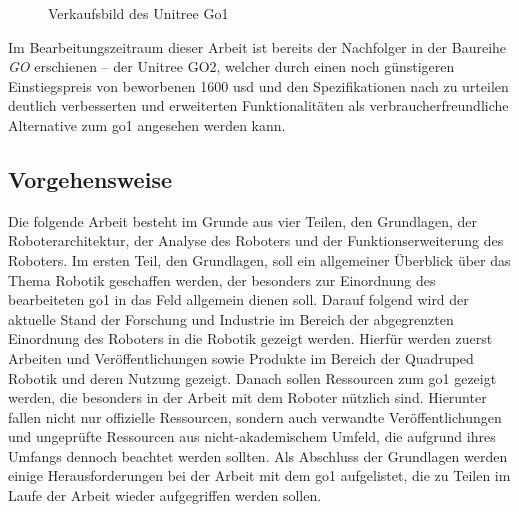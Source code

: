 \begin{figure}[h]
    \caption[Verkaufsbild des Unitree Go1]{Verkaufsbild des Unitree Go1\footnotemark}\label{fig:go1-ad-foto}
\end{figure}


Im Bearbeitungszeitraum dieser Arbeit ist bereits der Nachfolger in der Baureihe \emph{GO} erschienen -- der Unitree GO2,
welcher durch einen noch günstigeren Einstiegspreis von beworbenen \num{1600} \gls{usd} und den Spezifikationen nach zu urteilen
deutlich verbesserten und erweiterten Funktionalitäten als verbraucherfreundliche Alternative zum \gls{go1} angesehen
werden kann.

\subsection{Vorgehensweise}
\label{subsec:intro-vorgehensweise}

Die folgende Arbeit besteht im Grunde aus vier Teilen, den Grundlagen, der Roboterarchitektur, der Analyse des Roboters
und der Funktionserweiterung des Roboters.
Im ersten Teil, den Grundlagen, soll ein allgemeiner Überblick über das Thema Robotik geschaffen werden, der besonders zur
Einordnung des bearbeiteten \gls{go1} in das Feld allgemein dienen soll.
Darauf folgend wird der aktuelle Stand der Forschung und Industrie im Bereich der abgegrenzten Einordnung des Roboters
in die Robotik gezeigt werden.
Hierfür werden zuerst Arbeiten und Veröffentlichungen sowie Produkte im Bereich der Quadruped Robotik und deren Nutzung
gezeigt.
Danach sollen Ressourcen zum \gls{go1} gezeigt werden, die besonders in der Arbeit mit dem Roboter nützlich sind.
Hierunter fallen nicht nur offizielle Ressourcen, sondern auch verwandte Veröffentlichungen und ungeprüfte Ressourcen
aus nicht-akademischem Umfeld, die aufgrund ihres Umfangs dennoch beachtet werden sollten.
Als Abschluss der Grundlagen werden einige Herausforderungen bei der Arbeit mit dem \gls{go1} aufgelistet, die zu Teilen
im Laufe der Arbeit wieder aufgegriffen werden sollen.

